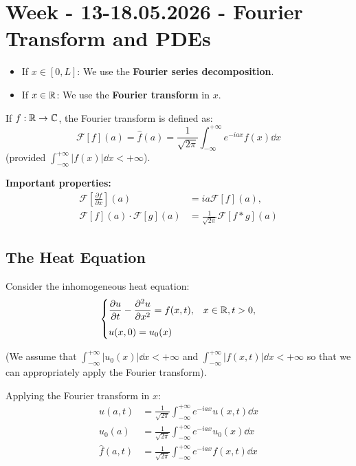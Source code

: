 \section{Week - 13-18.05.2026 - Fourier Transform and PDEs}

\begin{itemize}
    \item If $x \in [0,L]$: We use the \textbf{Fourier series decomposition}.
    \item If $x \in \mathbb{R}$: We use the \textbf{Fourier transform} in $x$.
\end{itemize}

\begin{recall}
    If $f : \mathbb{R} \rightarrow \mathbb{C}$, the Fourier transform is defined as:
    $$ \mathcal{F}[f](a) = \hat{f}(a) = \frac{1}{\sqrt{2\pi}} \int_{-\infty}^{+\infty} e^{-iax} f(x) \dd x $$
    (provided $\int_{-\infty}^{+\infty} |f(x)| \dd x < +\infty$).
\end{recall}

\textbf{Important properties:}
\begin{align*}
    \mathcal{F}\left[\frac{\partial f}{\partial x}\right](a) &= ia \mathcal{F}[f](a), \\[1ex]
    \mathcal{F}[f](a) \cdot \mathcal{F}[g](a) &= \frac{1}{\sqrt{2\pi}} \mathcal{F}[f * g](a)
\end{align*}

\subsection{The Heat Equation}

Consider the inhomogeneous heat equation:
\begin{equation}
\begin{cases}
    \displaystyle \frac{\partial u}{\partial t} - \frac{\partial^2 u}{\partial x^2} = f(x,t), & x \in \mathbb{R}, t>0, \\[2ex]
    u(x,0) = u_0(x)
\end{cases}
\end{equation}

(We assume that $\int_{-\infty}^{+\infty} |u_0(x)| \dd x < +\infty$ and $\int_{-\infty}^{+\infty} |f(x,t)| \dd x < +\infty$ so that we can appropriately apply the Fourier transform).

Applying the Fourier transform in $x$:
\begin{align*}
    \hat{u}(a,t) &= \frac{1}{\sqrt{2\pi}} \int_{-\infty}^{+\infty} e^{-iax} u(x,t) \dd x \\
    \hat{u}_0(a) &= \frac{1}{\sqrt{2\pi}} \int_{-\infty}^{+\infty} e^{-iax} u_0(x) \dd x \\
    \hat{f}(a,t) &= \frac{1}{\sqrt{2\pi}} \int_{-\infty}^{+\infty} e^{-iax} f(x,t) \dd x
\end{align*}


